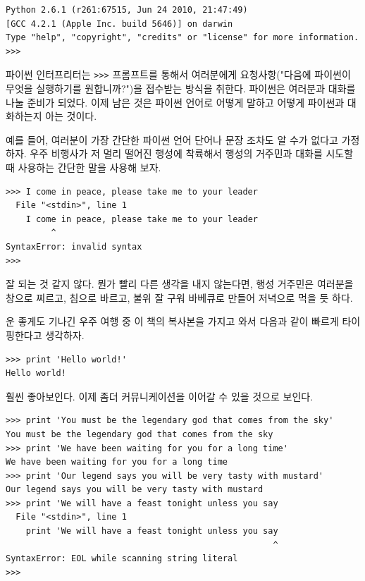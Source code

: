 
\beforeverb
\begin{verbatim}
Python 2.6.1 (r261:67515, Jun 24 2010, 21:47:49) 
[GCC 4.2.1 (Apple Inc. build 5646)] on darwin
Type "help", "copyright", "credits" or "license" for more information.
>>> 
\end{verbatim}
\afterverb
%


파이썬 인터프리터는 {\tt >>>} 프롬프트를 통해서 여러분에게 요청사항("다음에 파이썬이 무엇을 실행하기를 원합니까?")을 접수받는 방식을 취한다. 
파이썬은 여러분과 대화를 나눌 준비가 되었다. 
이제 남은 것은 파이썬 언어로 어떻게 말하고 어떻게 파이썬과 대화하는지 아는 것이다.

예를 들어, 여러분이 가장 간단한 파이썬 언어 단어나 문장 조차도 알 수가 없다고 가정하자. 
우주 비행사가 저 멀리 떨어진 행성에 착륙해서 행성의 거주민과 대화를 시도할 때 사용하는 간단한 말을 사용해 보자.

\beforeverb
\begin{verbatim}
>>> I come in peace, please take me to your leader
  File "<stdin>", line 1
    I come in peace, please take me to your leader
         ^
SyntaxError: invalid syntax
>>> 
\end{verbatim}
\afterverb
%

잘 되는 것 같지 않다. 
뭔가 빨리 다른 생각을 내지 않는다면, 
행성 거주민은 여러분을 창으로 찌르고, 침으로 바르고, 불위 잘 구워 바베큐로 만들어 저녁으로 먹을 듯 하다.

운 좋게도 기나긴 우주 여행 중 이 책의 복사본을 가지고 와서 다음과 같이 빠르게 타이핑한다고 생각하자.

\beforeverb
\begin{verbatim}
>>> print 'Hello world!'
Hello world!
\end{verbatim}
\afterverb
%

훨씬 좋아보인다. 이제 좀더 커뮤니케이션을 이어갈 수 있을 것으로 보인다.

\beforeverb
\begin{verbatim}
>>> print 'You must be the legendary god that comes from the sky'
You must be the legendary god that comes from the sky
>>> print 'We have been waiting for you for a long time'
We have been waiting for you for a long time
>>> print 'Our legend says you will be very tasty with mustard'
Our legend says you will be very tasty with mustard
>>> print 'We will have a feast tonight unless you say
  File "<stdin>", line 1
    print 'We will have a feast tonight unless you say
                                                     ^
SyntaxError: EOL while scanning string literal
>>> 
\end{verbatim}
\afterverb
%


